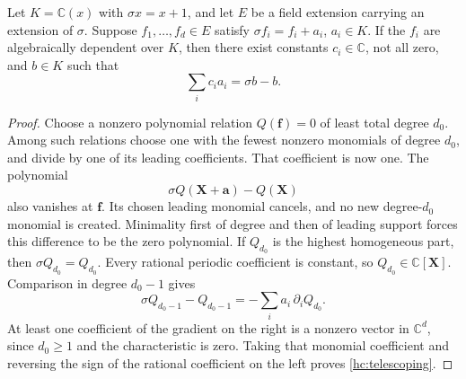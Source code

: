 \begin{lemma}
\label{hc:additive}
Let $K=\mathbb C(x)$ with $\sigma x=x+1$, and let $E$ be a field
extension carrying an extension of $\sigma$. Suppose
$f_1,\ldots,f_d\in E$ satisfy $\sigma f_i=f_i+a_i$, $a_i\in K$.
If the $f_i$ are algebraically dependent over $K$, then there exist
constants $c_i\in\mathbb C$, not all zero, and $b\in K$ such that
\begin{equation}\label{hc:telescoping}
                       \sum_i c_i a_i=\sigma b-b.
\end{equation}
\end{lemma}
\begin{proof}
Choose a nonzero polynomial relation $Q(\mathbf f)=0$ of least
total degree $d_0$. Among such relations choose one with the fewest
nonzero monomials of degree $d_0$, and divide by one of its leading
coefficients. That coefficient is now one. The polynomial
\[
              \sigma Q(\mathbf X+\mathbf a)-Q(\mathbf X)
\]
also vanishes at $\mathbf f$. Its chosen leading monomial cancels,
and no new degree-$d_0$ monomial is created. Minimality first of
degree and then of leading support forces this difference to be
the zero polynomial. If $Q_{d_0}$ is the highest homogeneous part,
then $\sigma Q_{d_0}=Q_{d_0}$. Every rational periodic coefficient
is constant, so $Q_{d_0}\in\mathbb C[\mathbf X]$.
Comparison in degree $d_0-1$ gives
\[
 \sigma Q_{d_0-1}-Q_{d_0-1}
              =-\sum_i a_i\,\partial_i Q_{d_0}.
\]
At least one coefficient of the gradient on the right is a
nonzero vector in $\mathbb C^d$, since $d_0\ge1$ and the
characteristic is zero. Taking that monomial coefficient and
reversing the sign of the rational coefficient on the left proves
\eqref{hc:telescoping}.
\end{proof}

